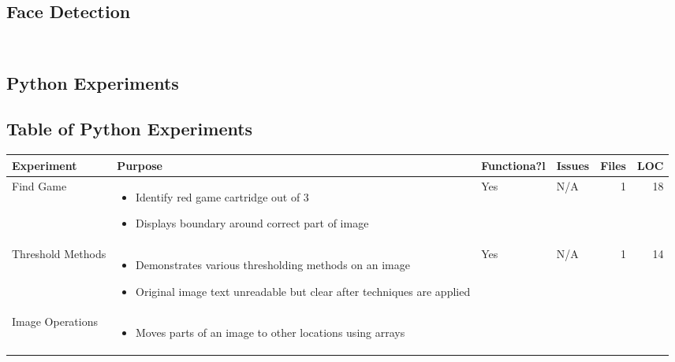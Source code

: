 \documentclass[a4paper, 12pt, hidelinks]{article}
\begin{document}
	\subsection{Face Detection}
	\inputminted[breaklines,
					linenos,
					frame=lines,
					fontsize=\footnotesize]{java}{../code/android/face_recognition/DetectionBasedTracker.java}
	\inputminted[breaklines,
					linenos,
					frame=lines,
					fontsize=\footnotesize]{java}{../code/android/face_recognition/FrActivity.java}
	\clearpage
		\thispagestyle{empty}
		\begin{landscape}
			\section{Python Experiments}\label{app:python_experiments}
			\subsection{Table of Python Experiments}
			\begin{table}[h!]
				\centering
				\label{tab:python_experiments}
				\begin{tabular}{|l|p{0.4\textwidth}|l|p{}|r|r|}
					\hline
					\bfseries Experiment&\bfseries Purpose&\bfseries Functiona?l&\bfseries Issues&\bfseries Files&\bfseries LOC\\
					\hline
					Find Game&
					\begin{itemize}[noitemsep,topsep=0pt,parsep=0pt]
						\item{Identify red game cartridge out of 3}
						\item{Displays boundary around correct part of image}
					\end{itemize}&
					Yes&
					N/A&
					1&
					18\\
					\hline
					Threshold Methods&
					\begin{itemize}[noitemsep,topsep=0pt,parsep=0pt]
						\item{Demonstrates various thresholding methods on an image}
						\item{Original image text unreadable but clear after techniques are applied}
					\end{itemize}&
					Yes&
					N/A&
					1&
					14\\
					\hline
					Image Operations&
					\begin{itemize}[noitemsep,topsep=0pt,parsep=0pt]
						\item{Moves parts of an image to other locations using arrays}

\end{itemize}
\end{tabular}
\end{table}
\end{landscape}
\end{document}
